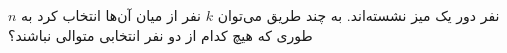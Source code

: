\EXERCISE
$n$
نفر دور یک میز نشسته‌اند. به چند طریق می‌توان
$k$
نفر از میان آن‌ها انتخاب کرد به طوری که هیچ کدام از دو نفر انتخابی متوالی نباشند؟